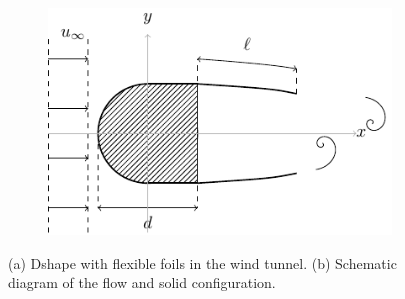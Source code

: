 \documentclass[a4paper,11pt]{article}
\begin{document}
\begin{figure}
\begin{subfigure}[b]{.5\textwidth}
\begin{tikzpicture}
	
	\end{tikzpicture}
\subcaption{ }	
\end{subfigure}	
\begin{subfigure}[b]{.5\textwidth}
	\includegraphics[width=\textwidth]{./setup_scheme}
	\subcaption{ }
\end{subfigure}
\label{fig}
\vspace{-0.5cm}
\caption{(a) Dshape with flexible foils in the wind tunnel. (b) Schematic diagram of the flow and solid configuration.}\label{fig_setup}
\end{figure}



\setlength{\bibsep}{.5ex}
%
%
%
% 
%
%
 
\end{document}
